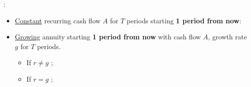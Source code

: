 \documentclass[10pt,landscape]{article}
\makeatletter
\newcommand{\Blue}[1]{\noindent{\textcolor{Blue}{\textbf{#1}}}:}
\newcommand{\Hint}[1]{\noindent{\textcolor{Orange}{#1}}}
\newcommand*{\Eg}{E.g.\@\xspace}
\makeatother
\begin{document}
\begin{multicols}{4}
\Blue{Annuity}
\begin{itemize}
    \item \underline{Constant} recurring cash flow $A$ for $T$ periods starting \textbf{1 period from now}:
        \Hint{(\Eg a loan)}
    \item \underline{Growing} annuity starting \textbf{1 period from now} with cash flow $A$, growth rate $g$ for $T$ periods.
        \begin{itemize}
            \item If $r \neq g$
                ;
            \item If $r = g$
                ;
        \end{itemize}
\end{itemize}

\end{multicols}
\end{document}
